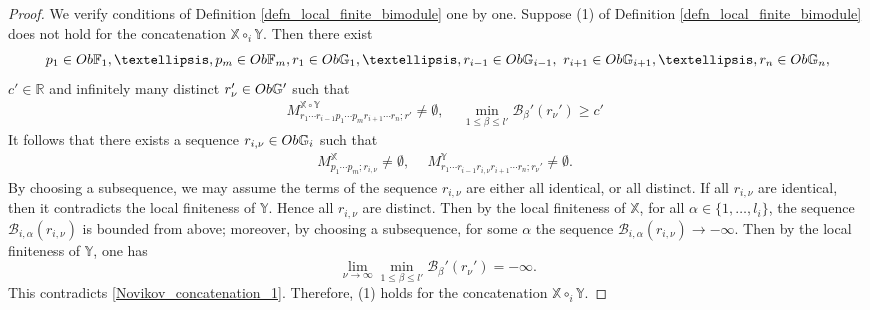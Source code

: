 \documentclass[10pt,a4paper]{amsart}
\newcommand{\beqn}{\begin{equation*}}
\newcommand{\eeqn}{\end{equation*}}
\newcommand{\mb}{\mathbb}
\newcommand{\mc}{\mathcal}
\begin{document}
\begin{proof}
We verify conditions of Definition \ref{defn_local_finite_bimodule} one by one. Suppose (1) of Definition \ref{defn_local_finite_bimodule} does not hold for the concatenation ${\mb X} \circ_i {\mb Y}$. Then there exist 
\beqn
p_1 \in {\rm Ob}{\mb F}_1, \ldots, p_m \in {\rm Ob}{\mb F}_m, r_1 \in {\rm Ob}{\mb G}_1, \ldots, r_{i-1} \in {\rm Ob}{\mb G}_{i-1},\ r_{i+1} \in {\rm Ob}{\mb G}_{i+1}, \ldots, r_n \in {\rm Ob}{\mb G}_n,
\eeqn
$c' \in {\mb R}$ and infinitely many distinct $r_\nu'\in {\rm Ob}{\mb G}'$ such that 
\begin{align}\label{Novikov_concatenation_1}
&\ M_{r_1 \cdots r_{i-1} p_1 \cdots p_m r_{i+1} \cdots r_n; r'}^{{\mb X} \circ {\mb Y} } \neq \emptyset,\ &\ \min_{1 \leq \beta \leq l'} {\mc B}_\beta'(r_\nu') \geq c'
\end{align}
It follows that there exists a sequence $r_{i, \nu} \in {\rm Ob}{\mb G}_i$ such that 
\begin{align*}
&\ M_{p_1 \cdots p_m; r_{i,\nu}}^{\mb X} \neq \emptyset,\ &\ M_{r_1 \cdots r_{i-1} r_{i, \nu} r_{i+1} \cdots r_n; r_\nu'}^{\mb Y} \neq \emptyset.
\end{align*}
By choosing a subsequence, we may assume the terms of the sequence $r_{i, \nu}$ are either all identical, or all distinct. If all $r_{i, \nu}$ are identical, then it contradicts the local finiteness of ${\mb Y}$. Hence all $r_{i, \nu}$ are distinct. Then by the local finiteness of ${\mb X}$, for all $\alpha\in \{1, \ldots, l_i\}$, the sequence ${\mc B}_{i, \alpha}(r_{i, \nu})$ is bounded from above; moreover, by choosing a subsequence, for some $\alpha$ the sequence ${\mc B}_{i,\alpha}(r_{i,\nu}) \to -\infty$. Then by the local finiteness of ${\mb Y}$, one has
\beqn
\lim_{\nu \to \infty} \min_{1 \leq \beta \leq l'} {\mc B}_\beta'(r_\nu') = -\infty.
\eeqn
This contradicts \eqref{Novikov_concatenation_1}. Therefore, (1) holds for the concatenation ${\mb X} \circ_i {\mb Y}$. 


\end{proof}
\end{document}
